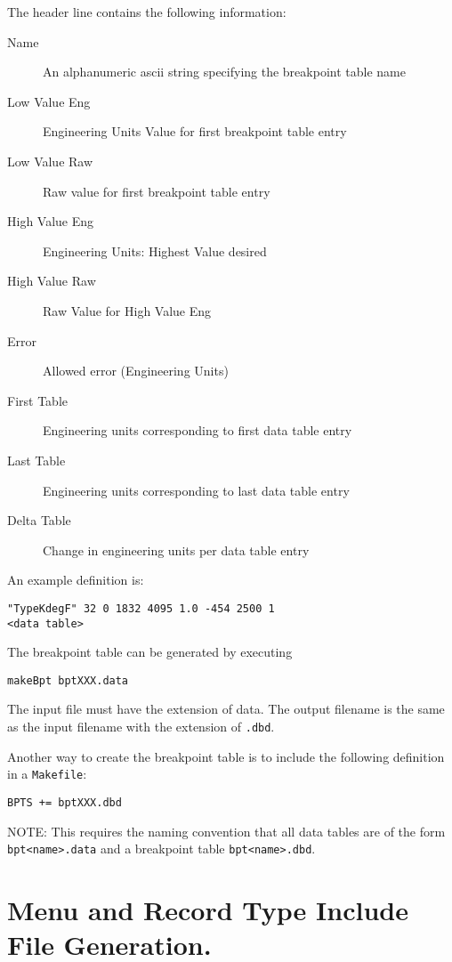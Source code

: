 The header line contains the following information:

\begin{description}
\item [Name] An alphanumeric ascii string specifying the breakpoint table name
\item [Low Value Eng] Engineering Units Value for first breakpoint table entry
\item [Low Value Raw] Raw value for first breakpoint table entry
\item [High Value Eng] Engineering Units: Highest Value desired
\item [High Value Raw] Raw Value for High Value Eng
\item [Error] Allowed error (Engineering Units)
\item [First Table] Engineering units corresponding to first data table entry
\item [Last Table] Engineering units corresponding to last data table entry
\item [Delta Table] Change in engineering units per data table entry
\end{description}

 An example definition is:

\begin{verbatim}
"TypeKdegF" 32 0 1832 4095 1.0 -454 2500 1
<data table>
\end{verbatim}

The breakpoint table can be generated by executing

\begin{verbatim}
makeBpt bptXXX.data
\end{verbatim}

The input file must have the extension of data.
The output filename is the same as the input filename with the extension of \verb|.dbd|.

Another way to create the breakpoint table is to include the following definition in a \verb|Makefile|:

\begin{verbatim}
BPTS += bptXXX.dbd
\end{verbatim}

NOTE: This requires the naming convention that all data tables are of the form \verb|bpt<name>.data| and a breakpoint table \verb|bpt<name>.dbd|.

\section{Menu and Record Type Include File Generation.}

